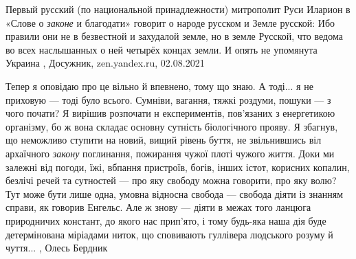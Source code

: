 Первый русский (по национальной принадлежности) митрополит Руси Иларион в
«Слове о \emph{законе} и благодати» говорит о народе русском и Земле русской:
Ибо правили они не в безвестной и захудалой земле, но в земле Русской, что
ведома во всех наслышанных о ней четырёх концах земли.
И опять не упомянута Украина
, Досужник, zen.yandex.ru, 02.08.2021

Тепер я оповідаю про це вільно й впевнено, тому що знаю. А тоді... я не приховую
— тоді було всього. Сумніви, вагання, тяжкі роздуми, пошуки — з чого почати? Я
вирішив розпочати н експериментів, пов’язаних з енергетикою організму, бо ж
вона складає основну сутність біологічного прояву. Я збагнув, що неможливо
ступити на новий, вищий рівень буття, не звільнившись віл архаїчного \emph{закону}
поглинання, пожирання чужої плоті чужого життя. Доки ми залежні від погоди,
їжі, вбпання пристроїв, богів, інших істот, корисних копалин, безлічі речей та
сутностей — про яку свободу можна говорити, про яку волю? Тут може бути лише
одна, умовна відносна свобода — свобода діяти із знанням справи, як говорив
Енгельс. Але ж знову — діяти в межах того ланцюга природничих констант, до
якого нас прип'ято, і тому будь-яка наша дія буде детермінована міріадами
ниток, що сповивають гуллівера людського розуму й чуття...
, Олесь Бердник
